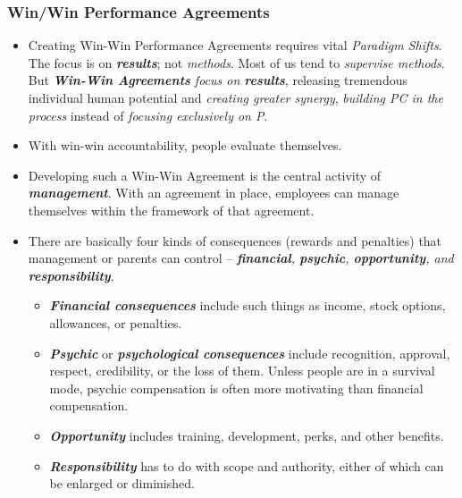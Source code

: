 \documentclass[11pt]{article}
\begin{document}
\subsubsection{Win/Win Performance Agreements}
\begin{itemize}
\item Creating Win-Win Performance Agreements requires vital \emph{Paradigm Shifts}. The focus is on \emph{\textbf{results}}; not \emph{methods}. Most of us tend to \emph{supervise methods}. But \emph{\textbf{Win-Win Agreements} focus on \textbf{results}}, releasing tremendous individual human potential and \emph{creating greater synergy}, \emph{building PC in the process} instead of \emph{focusing exclusively on P}.

\item With win-win accountability, people evaluate themselves. 

\item Developing such a Win-Win Agreement is the central activity of \emph{\textbf{management}}. With an agreement in place, employees can manage themselves within the framework of that agreement. 

\item There are basically four kinds of consequences (rewards and penalties) that management or parents can control -- \emph{\textbf{financial}, \textbf{psychic}, \textbf{opportunity}, and \textbf{responsibility}}. 
\begin{itemize}
\item \emph{\textbf{Financial consequences}} include such things as income, stock options, allowances, or penalties. 
\item \emph{\textbf{Psychic}} or \emph{\textbf{psychological consequences}} include recognition, approval, respect, credibility, or the loss of them. Unless people are in a survival mode, psychic compensation is often more motivating than financial compensation. 
\item \emph{\textbf{Opportunity}} includes training, development, perks, and other benefits. 
\item \emph{\textbf{Responsibility}} has to do with scope and authority, either of which can be enlarged or diminished.
\end{itemize}
\end{itemize}
\end{document}
